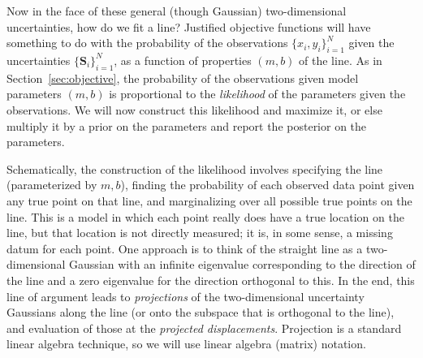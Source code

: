 \documentclass[12pt,twoside]{article}
\newcommand{\sectionname}{Section}
\newcommand{\mmatrix}[1]{\boldsymbol{#1}}
\newcommand{\mS}{\mmatrix{S}}
\newcommand{\setofall}[3]{\{{#1}\}_{{#2}}^{{#3}}}
\newcommand{\allxy}{\setofall{x_i,y_i}{i=1}{N}}
\newcommand{\allS}{\setofall{\mS_i}{i=1}{N}}
\begin{document}
Now in the face of these general (though Gaussian) two-dimensional
uncertainties, how do we fit a line?  Justified objective functions
will have something to do with the probability of the observations
$\allxy$ given the uncertainties $\allS$, as a function of properties
$(m,b)$ of the line.  As in \sectionname~\ref{sec:objective}, the
probability of the observations given model parameters $(m,b)$ is
proportional to the \emph{likelihood} of the parameters given the
observations.  We will now construct this likelihood and maximize it,
or else multiply it by a prior on the parameters and report the
posterior on the parameters.

Schematically, the construction of the likelihood involves specifying
the line (parameterized by $m,b$), finding the probability of each
observed data point given any true point on that line, and
marginalizing over all possible true points on the line.  This is a
model in which each point really does have a true location on the
line, but that location is not directly measured; it is, in some
sense, a missing datum for each point.  One approach is to think of
the straight line as a two-dimensional Gaussian with an infinite
eigenvalue corresponding to the direction of the line and a zero
eigenvalue for the direction orthogonal to this. In the end, this line
of argument leads to \emph{projections} of the two-dimensional
uncertainty Gaussians along the line (or onto the subspace that is
orthogonal to the line), and evaluation of those at the
\emph{projected displacements}.  Projection is a standard linear
algebra technique, so we will use linear algebra (matrix) notation.
\end{document}
